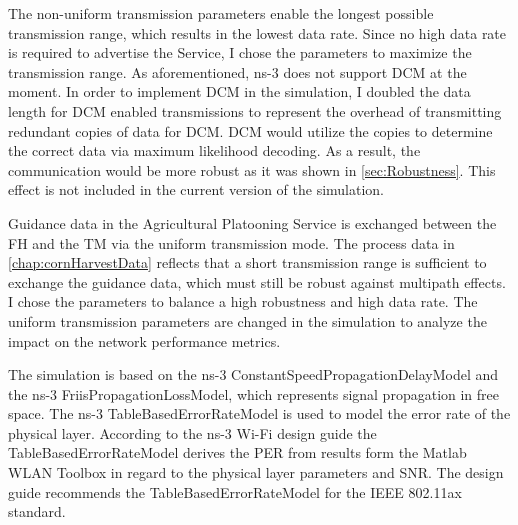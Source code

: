 The non-uniform transmission parameters enable the longest possible
transmission range, which results in the lowest data rate.
Since no high data rate is required to advertise the Service, I chose the parameters to maximize the transmission range.
As aforementioned, ns-3 does not support \ac{DCM} at the moment.
In order to implement \ac{DCM} in the simulation, I doubled the data length for \ac{DCM} enabled transmissions to
represent the overhead of transmitting redundant copies of data for \ac{DCM}. \ac{DCM} would utilize the copies to determine the
correct data via maximum likelihood decoding.
As a result, the communication would be more robust as it was shown in \autoref{sec:Robustness}.
This effect is not included in the current version of the simulation.

Guidance data in the Agricultural Platooning Service is exchanged between the \ac{FH} and the \ac{TM} via the
uniform transmission mode.
The process data in \autoref{chap:cornHarvestData} reflects that a short transmission range
is sufficient to exchange the guidance data, which must still be robust against multipath effects.
I chose the parameters to balance a high robustness and high data rate.
The uniform transmission parameters are changed in the simulation to analyze the impact on the network performance metrics.

The simulation is based on the ns-3 ConstantSpeedPropagationDelayModel and the  ns-3 FriisPropagationLossModel,
which represents signal propagation in free space.
The ns-3 TableBasedErrorRateModel is used to model the error rate of the physical layer. 
According to the ns-3 Wi-Fi design guide %
the TableBasedErrorRateModel derives the \ac{PER} from results form the Matlab WLAN Toolbox
in regard to the physical layer parameters and \ac{SNR}.
The design guide recommends the TableBasedErrorRateModel for the IEEE 802.11ax standard.


